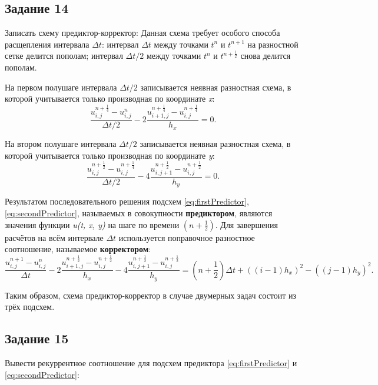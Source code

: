 \documentclass[12pt, a4paper]{report}
\begin{document}
	\subsection*{Задание 14}
	\large
	Записать схему предиктор-корректор:
	Данная схема требует особого способа расщепления интервала $\Delta t$: интервал $\Delta t$ между точками $t^{n}$ и $t^{n+1}$ на разностной сетке делится пополам; интервал $\Delta t/2$ между точками $t^{n}$ и $t^{n+\frac{1}{2}}$ снова делится пополам. \par
	На первом полушаге интервала $\Delta t/2$ записывается неявная разностная схема, в которой учитывается только производная по координате \textit{x}:
	\begin{equation}\label{eq:firstPredictor}
		\frac{u_{i, j}^{n+\frac{1}{4}} - u_{i, j}^{n}}{\Delta t/2} - 2\frac{u_{i+1, j}^{n+\frac{1}{4}} - u_{i, j}^{n+\frac{1}{4}}}{h_{x}} = 0.
	\end{equation}
	\par
	На втором полушаге интервала $\Delta t/2$ записывается неявная разностная схема, в которой учитывается только производная по координате \textit{y}:
	\begin{equation}\label{eq:secondPredictor}
		\frac{u_{i, j}^{n+\frac{1}{2}} - u_{i, j}^{n+\frac{1}{4}}}{\Delta t/2} - 4\frac{u_{i, j+1}^{n+\frac{1}{2}} - u_{i, j}^{n+\frac{1}{2}}}{h_{y}} = 0.
	\end{equation}
	\par
	Результатом последовательного решения подсхем \eqref{eq:firstPredictor}, \eqref{eq:secondPredictor}, называемых в совокупности \textbf{предиктором}, являются значения функции \textit{u(t, x, y)} на шаге по времени $(n+\frac{1}{2})$. Для завершения расчётов на всём интервале $\Delta t$ используется поправочное разностное соотношение, называемое \textbf{корректором}:
	\begin{equation}\label{eq:corrector}
		\frac{u_{i, j}^{n+1} - u_{i, j}^{n}}{\Delta t} - 2\frac{u_{i+1, j}^{n+\frac{1}{2}} - u_{i, j}^{n+\frac{1}{2}}}{h_{x}} - 4\frac{u_{i, j+1}^{n+\frac{1}{2}} - u_{i, j}^{n+\frac{1}{2}}}{h_{y}} = (n+\frac{1}{2})\Delta t + ((i-1)h_{x})^{2} - ((j-1)h_{y})^{2}.
	\end{equation}
	\par
	Таким образом, схема предиктор-корректор в случае двумерных задач состоит из трёх подсхем.

	\subsection*{Задание 15}
	\large
	Вывести рекуррентное соотношение для подсхем предиктора \eqref{eq:firstPredictor} и \eqref{eq:secondPredictor}: \par
\end{document}
